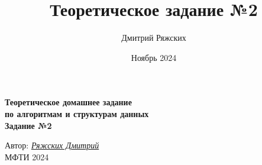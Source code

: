\documentclass[a4paper,14pt]{article}
\title{Теоретическое задание №2}
\author{Дмитрий Ряжских}
\date{Ноябрь 2024}
\begin{document}
\begin{titlepage}
	\clearpage\thispagestyle{empty}
	\centering
	\vspace{0.5ex}
	
	\textbf{Теоретическое домашнее задание \\ по алгоритмам и структурам данных \\ Задание №2}
	\vspace{20ex}
	\vspace{13ex}
	
	\vspace{1ex}
	Автор: \href{https://t.me/dimka_ryaz}{\textit{Ряжских Дмитрий}}\\

	\vfill
	   МФТИ 2024 
	\pagebreak
	
\end{titlepage}










\end{document}
